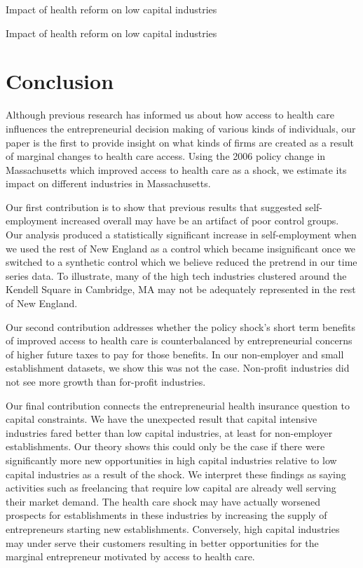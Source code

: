 \documentclass[12pt]{article}
\begin{document}
\begin{table}[H]
	\centering
	
	\caption{Impact of health reform on low capital industries}
	\label{tab:capital_ne}
\end{table}

\begin{table}[H]
	\centering
	
	\caption{Impact of health reform on low capital industries}
	\label{tab:capital_em}
\end{table}

\section{Conclusion}
\label{sec:conclude}

Although previous research has informed us about how access to health care influences the entrepreneurial decision making of various kinds of individuals, our paper is the first to provide insight on what kinds of firms are created as a result of marginal changes to health care access. Using the 2006 policy change in Massachusetts which improved access to health care as a shock, we estimate its impact on different industries in Massachusetts. 

Our first contribution is to show that previous results that suggested self-employment increased overall may have be an artifact of poor control groups. Our analysis produced a statistically significant increase in self-employment when we used the rest of New England as a control which became insignificant once we switched to a synthetic control which we believe reduced the pretrend in our time series data. To illustrate, many of the high tech industries clustered around the Kendell Square in Cambridge, MA may not be adequately represented in the rest of New England.

Our second contribution addresses whether the policy shock's short term benefits of improved access to health care is counterbalanced by entrepreneurial concerns of higher future taxes to pay for those benefits. In our non-employer and small establishment datasets, we show this was not the case. Non-profit industries did not see more growth than for-profit industries. 

Our final contribution connects the entrepreneurial health insurance question to capital constraints. We have the unexpected result that capital intensive industries fared better than low capital industries, at least for non-employer establishments. Our theory shows this could only be the case if there were significantly more new opportunities in high capital industries relative to low capital industries as a result of the shock. We interpret these findings as saying activities such as freelancing that require low capital are already well serving their market demand. The health care shock may have actually worsened prospects for establishments in these industries by increasing the supply of entrepreneurs starting new establishments. Conversely, high capital industries may under serve their customers resulting in better opportunities for the marginal entrepreneur motivated by access to health care. 
\end{document}
